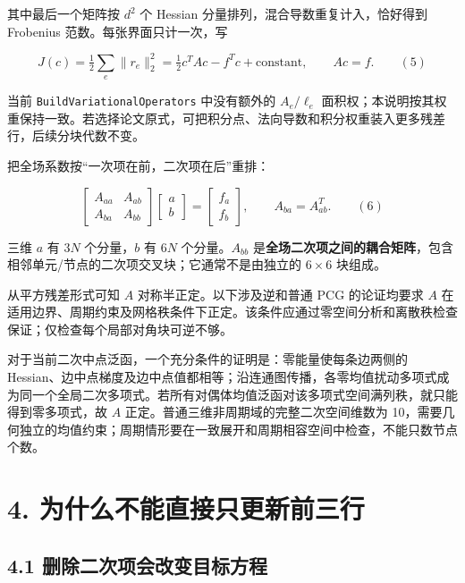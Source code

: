 \documentclass[
  11pt,
  a4paper,
]{article}
\begin{document}
其中最后一个矩阵按 \(d^2\) 个 Hessian
分量排列，混合导数重复计入，恰好得到 Frobenius
范数。每张界面只计一次，写

\[
J(c)=\tfrac12\sum_e\|r_e\|_2^2
=\tfrac12 c^TAc-f^Tc+\text{constant},\qquad Ac=f. \qquad(5)
\]

当前 \texttt{BuildVariationalOperators} 中没有额外的 \(A_e/\ell_e\)
面积权；本说明按其权重保持一致。若选择论文原式，可把积分点、法向导数和积分权重装入更多残差行，后续分块代数不变。

把全场系数按``一次项在前，二次项在后''重排：

\[
\begin{bmatrix}A_{aa}&A_{ab}\\A_{ba}&A_{bb}\end{bmatrix}
\begin{bmatrix}a\\b\end{bmatrix}
=\begin{bmatrix}f_a\\f_b\end{bmatrix},\qquad A_{ba}=A_{ab}^T. \qquad(6)
\]

三维 \(a\) 有 \(3N\) 个分量，\(b\) 有 \(6N\) 个分量。\(A_{bb}\)
是\textbf{全场二次项之间的耦合矩阵}，包含相邻单元/节点的二次项交叉块；它通常不是由独立的
\(6\times6\) 块组成。

从平方残差形式可知 \(A\) 对称半正定。以下涉及逆和普通 PCG 的论证均要求
\(A\)
在适用边界、周期约束及网格秩条件下正定。该条件应通过零空间分析和离散秩检查保证；仅检查每个局部对角块可逆不够。

对于当前二次中点泛函，一个充分条件的证明是：零能量使每条边两侧的
Hessian、边中点梯度及边中点值都相等；沿连通图传播，各零均值扰动多项式成为同一个全局二次多项式。若所有对偶体均值泛函对该多项式空间满列秩，就只能得到零多项式，故
\(A\) 正定。普通三维非周期域的完整二次空间维数为
10，需要几何独立的均值约束；周期情形要在一致展开和周期相容空间中检查，不能只数节点个数。

\hypertarget{ux4e3aux4ec0ux4e48ux4e0dux80fdux76f4ux63a5ux53eaux66f4ux65b0ux524dux4e09ux884c}{%
\section{4.
为什么不能直接只更新前三行}\label{ux4e3aux4ec0ux4e48ux4e0dux80fdux76f4ux63a5ux53eaux66f4ux65b0ux524dux4e09ux884c}}

\hypertarget{ux5220ux9664ux4e8cux6b21ux9879ux4f1aux6539ux53d8ux76eeux6807ux65b9ux7a0b}{%
\subsection{4.1
删除二次项会改变目标方程}\label{ux5220ux9664ux4e8cux6b21ux9879ux4f1aux6539ux53d8ux76eeux6807ux65b9ux7a0b}}
\end{document}

